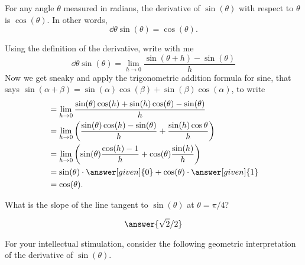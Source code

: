 \documentclass{ximera}
\begin{document}
\begin{theorem}\label{theorem:deriv sin}
For any angle $\theta$ measured in radians, the derivative of $\sin(\theta)$ with respect to $\theta$ is $\cos(\theta)$.  In other words, 
\[
\dd{\theta} \sin(\theta) = \cos(\theta).
\]
\begin{explanation}
Using the definition of the derivative, write with me
\[
\dd{\theta} \sin(\theta) = \lim_{h\to0} \frac{\sin(\theta+h)-\sin(\theta)}{h}
\]
Now we get sneaky and apply the trigonometric addition formula for sine, that says $\sin(\alpha+\beta) = \sin(\alpha)\cos(\beta)+\sin(\beta)\cos(\alpha)$, to write
\begin{align*}
  &= \lim_{h\to0} \frac{\sin(\theta)\cos(h)+\sin(h)\cos(\theta)-\sin(\theta)}{h}  \\
  &= \lim_{h\to0} \left(\frac{\sin(\theta)\cos(h)-\sin(\theta)}{h} + \frac{\sin(h)\cos{\theta}}{h} \right)\\
  &=\lim_{h\to0} \left(\sin (\theta)\frac{\cos(h) - 1}{h}+\cos(\theta)\frac{\sin(h)}{h}\right) \\
  &=\sin(\theta) \cdot \answer[given]{0} + \cos(\theta) \cdot \answer[given]{1}\\
  &= \cos(\theta). 
\end{align*}
\end{explanation}
\end{theorem}

\begin{question}
  What is the slope of the line tangent to $\sin(\theta)$ at $\theta =
  \pi/4$?
  \begin{prompt}
    \[
    \answer{\sqrt{2}/2}
    \]
  \end{prompt}
\end{question}

For your intellectual stimulation, consider the following geometric
interpretation of the derivative of $\sin(\theta)$.
\end{document}
